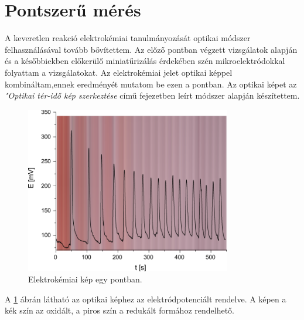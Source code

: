 \section{Pontszerű mérés}
A keveretlen reakció elektrokémiai tanulmányozását optikai módszer felhasználásával tovább bővítettem. Az előző pontban végzett vizsgálatok alapján és a későbbiekben előkerülő miniatűrizálás érdekében szén mikroelektródokkal folyattam a vizsgálatokat. Az elektrokémiai jelet optikai képpel kombináltam,ennek eredményét  mutatom be ezen a pontban. Az optikai képet az \emph{"Optikai tér-idő kép szerkeztése} című fejezetben leírt módszer alapján készítettem.
\begin{figure}[h]
\centering
\includegraphics[width=0.8\textwidth]{img/pontszerumeres.png}
\caption{Elektrokémiai kép egy pontban.}
\label{fig:pontszerumeres}
\end{figure}

A \ref{fig:pontszerumeres} ábrán látható az optikai képhez az elektródpotenciált rendelve. A képen a kék szín az oxidált, a piros szín a redukált formához rendelhető.

